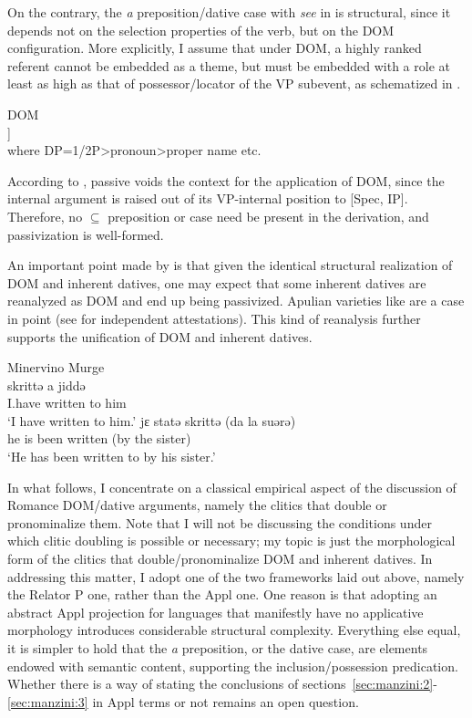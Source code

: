 \documentclass[output=paper,colorlinks,citecolor=brown]{./langscibook}
\begin{document}
On the contrary, the \textit{a} preposition/dative case with \textit{see} in  is structural, since it depends not on the selection properties of the verb, but on the DOM configuration. More explicitly, I assume that under DOM, a highly ranked referent cannot be embedded as a theme, but must be embedded with a role at least as high as that of possessor/locator of the VP subevent, as schematized in .

\ea%
    \label{ex:manzini:8}
    DOM\\
    [\textsubscript{VP} V   [*(P${\subseteq}$) DP]]\\
    where DP=1/2P>pronoun>proper name etc.
\z

According to \citeauthor{ManziniFranco2016}, passive voids the context for the application of DOM, since the internal argument is raised out of its VP-internal position to [Spec, IP]. Therefore, no ${\subseteq}$ preposition or case need be present in the derivation, and passivization is well-formed.  

An important point made by \citet{Pineda2016} is that given the identical structural realization of DOM and inherent datives, one may expect that some inherent datives are reanalyzed as DOM and end up being passivized. Apulian varieties like  are a case in point (see \citealt{Loporcaro1988, Ledgeway2000} for independent attestations). This kind of reanalysis further supports the unification of DOM and inherent datives.

\ea%
    \label{ex:manzini:9}
    Minervino Murge\\
    \ea\label{ex:manzini:9a} 
       {skrittə}   {a} {jiddə}\\
        I.have  written  to him\\
    \glt ‘I have written to him.’
    \ex\label{ex:manzini:9b}
       {jɛ}   {statə}   {skrittə}   (da la suərə)\\
        he  is  been   written (by the sister)\\
    \glt ‘He has been written to by his sister.’
    \z
\z

In what follows, I concentrate on a classical empirical aspect of the discussion of Romance DOM/dative arguments, namely the clitics that double or pronominalize them. Note that I will not be discussing the conditions under which clitic doubling is possible or necessary; my topic is just the morphological form of the clitics that double/pronominalize DOM and inherent datives. In addressing this matter, I adopt one of the two frameworks laid out above, namely the Relator P one, rather than the Appl one. One reason is that adopting an abstract Appl projection for languages that manifestly have no applicative morphology introduces considerable structural complexity. Everything else equal, it is simpler to hold that the \textit{a} preposition, or the dative case, are elements endowed with semantic content, supporting the inclusion/possession predication. Whether there is a way of stating the conclusions of sections~\ref{sec:manzini:2}-\ref{sec:manzini:3} in Appl terms or not remains an open question.
\end{document}
